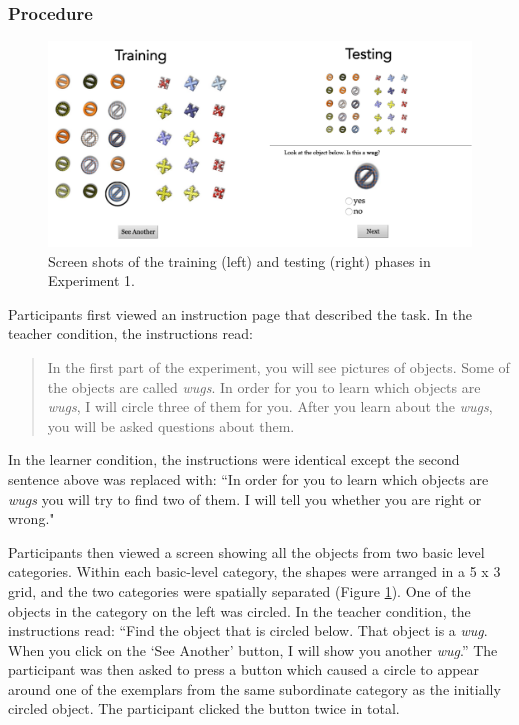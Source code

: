 \documentclass[man]{apa2}
\begin{document}
\subsubsection{Procedure}
 \begin{figure} [t]
 \begin{center} 
  \includegraphics[width=5.5in]{figures/screen.png} 
  \caption{\label{fig:screen} Screen shots of the training (left) and testing (right) phases in Experiment 1. } 
 \end{center} 
\end{figure}


Participants first viewed an instruction page that described the task. In the teacher condition, the instructions read: 
\begin{quote}
In the first part of the experiment, you will see pictures of objects. Some of the objects are called  \textit{wugs}. In order for you to learn which objects are  \textit{wugs}, I will circle three of them for you. After you learn about the  \textit{wugs}, you will be asked questions about them.
\end{quote}
In the learner condition, the instructions were identical except the second sentence above was replaced with: ``In order for you to learn which objects are  \textit{wugs} you will try to find two of them. I will tell you whether you are right or wrong."

Participants then viewed a screen showing all the objects from two basic level categories. Within each basic-level category, the shapes were arranged in a 5 x 3 grid, and the two categories were spatially separated (Figure \ref{fig:screen}). One of the objects in the category  on the left  was circled. In the teacher condition, the instructions read: ``Find the object that is circled below. That object is a \textit{wug}. When you click on the `See Another' button, I will show you another \textit{wug}.'' The participant  was then asked to press a button which caused a circle to appear around one of the exemplars from the same subordinate category as the initially circled object. The participant clicked the button twice in total. 
\end{document}
